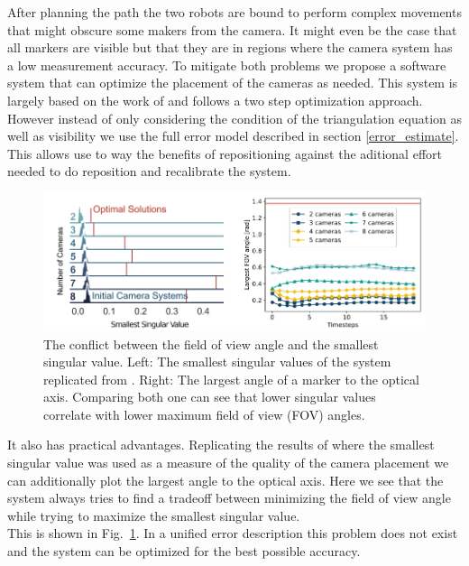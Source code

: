 \documentclass[5p,times,procedia]{elsarticle}
\begin{document}
After planning the path the two robots are bound to perform complex movements that might obscure some makers from the camera.
It might even be the case that all markers are visible but that they are in regions where the camera system has a low measurement accuracy.
To mitigate both problems we propose a software system that can optimize the placement of the cameras as needed.
This system is largely based on the work of \cite{camera_placement} and follows a two step optimization approach.
However instead of only considering the condition of the triangulation equation as well as visibility we use the full error model described in section \ref{error_estimate}.
This allows use to way the benefits of repositioning against the aditional effort needed to do reposition and recalibrate the system.

\begin{figure}[!htb]
	\centering
	\includegraphics[width=\columnwidth]{graphics/fov_sv_conflict.png}
	\caption{The conflict between the field of view angle and the smallest singular value. Left: The smallest singular values of the system replicated from \cite{camera_placement}. Right: The largest angle of a marker to the optical axis.
		Comparing both one can see that lower singular values correlate with lower maximum field of view (FOV) angles.}
	\label{fig:fov_sv_conflict}
\end{figure}

It also has practical advantages.
Replicating the results of \cite{camera_placement} where the smallest singular value was used as a measure of the quality of the camera placement we can additionally plot the largest angle to the optical axis.
Here we see that the system always tries to find a tradeoff between minimizing the field of view angle while trying to maximize the smallest singular value.\\
This is shown in Fig.~\ref{fig:fov_sv_conflict}.
In a unified error description this problem does not exist and the system can be optimized for the best possible accuracy.
\end{document}
